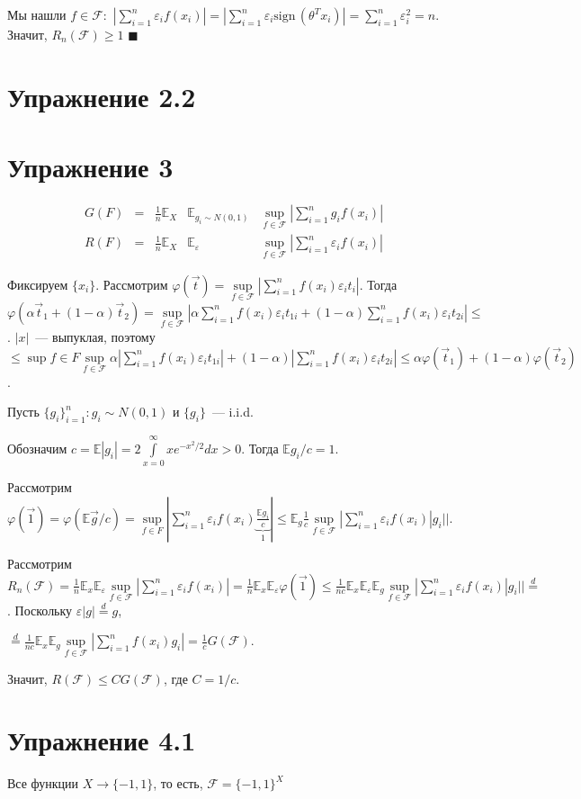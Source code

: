 \documentclass[a4paper]{article}
\newcommand{\sign}{\mbox{sign}\,}
\newcommand{\F}{\mathcal{F}}
\newcommand{\E}{\mathbb{E}}
\def\eps{\varepsilon}
\begin{document}
Мы нашли $f\in\F\colon $ $|\sum\limits_{i=1}^n \eps_i f(x_i)|=|\sum\limits_{i=1}^n \eps_i \sign(\theta^Tx_i)|=\sum\limits_{i=1}^n \eps_i^2=n$. Значит, $\boxed{R_n(\F)\geqslant 1}$ $\blacksquare$
\section*{Упражнение 2.2}
\section*{Упражнение 3}
$$
\begin{array}{ccccc}
G(F)&=&\frac{1}{n}\E_X&\E_{g_i\sim N(0,1)}&\sup\limits_{f\in \F}|\sum\limits_{i=1}^n g_if(x_i)|\\
R(F)&=&\frac{1}{n}\E_X&\E_{\eps}&\sup\limits_{f\in \F}|\sum\limits_{i=1}^n \eps_if(x_i)|
\end{array}$$

Фиксируем $\{x_i\}$. Рассмотрим $\varphi(\vec{t})=\sup\limits_{f\in\F}|\sum\limits_{i=1}^n f(x_i)\eps_i t_i|$. Тогда $\varphi(\alpha\vec{t}_1+(1-\alpha)\vec{t}_2)=\sup\limits_{f\in\F}|\alpha\sum\limits_{i=1}^n f(x_i)\eps_i t_{1i}+(1-\alpha)\sum\limits_{i=1}^n f(x_i)\eps_i t_{2i}|\boxed{\leqslant}$. $|x|$~--- выпуклая, поэтому $\boxed{\leqslant}\sup f\in F\sup\limits_{f\in\F}\alpha|\sum\limits_{i=1}^n f(x_i)\eps_i t_{1i}|+(1-\alpha)|\sum\limits_{i=1}^n f(x_i)\eps_i t_{2i}|\leqslant \alpha\varphi(\vec{t}_1)+(1-\alpha)\varphi(\vec{t}_2)$.

Пусть $\{g_i\}_{i=1}^n\colon g_i\sim N(0,1)$ и $\{g_i\}$~--- i.i.d.

Обозначим $c=\mathbb{E}|g_i|=2\int\limits_{x=0}^\infty x e^{-x^2/2}dx >0$. Тогда $\E g_i/c=1$.

Рассмотрим $\varphi(\vec{1})=\varphi(\E\vec{g}/c)=\sup\limits_{f\in F}|\sum\limits_{i=1}^n \eps_i f(x_i) \underbrace{\frac{\E g_i}{c}}_1|\leqslant \E_{g}\frac{1}{c}\sup\limits_{f\in \F}|\sum\limits_{i=1}^n \eps_if(x_i)|g_i||$.

Рассмотрим $R_n(\F)=\frac{1}{n}\E_x\E_\eps\sup\limits_{f\in\F}|\sum\limits_{i=1}^n \eps_if(x_i)|=\frac{1}{n}\E_x\E_\eps \varphi(\vec{1})\leqslant \frac{1}{nc}\E_x\E_\eps\E_g \sup\limits_{f\in \F}|\sum\limits_{i=1}^n \eps_if(x_i)|g_i||\overset{d}{=}$. Поскольку $\eps |g|\overset{d}{=}g$,

$\overset{d}{=}\frac{1}{nc}\E_x\E_g\sup\limits_{f\in \F}|\sum\limits_{i=1}^n f(x_i)g_i|=\frac{1}{c}G(\F)$.

Значит, $R(\F)\leqslant CG(\F)$, где $C=1/c$.
\section*{Упражнение 4.1}
Все функции $X\to \{-1,1\}$, то есть, $\F=\{-1,1\}^X$
\end{document}
